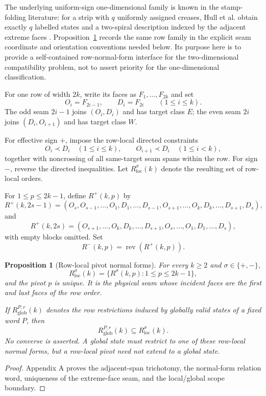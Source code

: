\documentclass[11pt]{article}
\newtheorem{proposition}[theorem]{Proposition}
\theoremstyle{definition}
\theoremstyle{remark}
\begin{document}
The underlying uniform-sign one-dimensional family is known in the stamp-folding literature: for a strip with $q$ uniformly assigned creases, Hull et al. obtain exactly $q$ labelled states and a two-spiral description indexed by the adjacent extreme faces \cite[Theorem~2.1 and the proof of Theorem~3.1]{HullEtAl2025}. Proposition~\ref{obj:P2} records the same row family in the explicit seam coordinate and orientation conventions needed below. Its purpose here is to provide a self-contained row-normal-form interface for the two-dimensional compatibility problem, not to assert priority for the one-dimensional classification.

For one row of width \(2k\), write its faces as \(F_1,\ldots,F_{2k}\)
and set \[
O_i=F_{2i-1},\qquad D_i=F_{2i}\qquad(1\le i\le k).
\] The odd seam \(2i-1\) joins \((O_i,D_i)\) and has target class \(E\);
the even seam \(2i\) joins \((D_i,O_{i+1})\) and has target class \(W\).

For effective sign \(+\), impose the row-local directed constraints \[
O_i\prec D_i\quad(1\le i\le k),\qquad
O_{i+1}\prec D_i\quad(1\le i<k),
\] together with noncrossing of all same-target seam spans within the
row. For sign \(-\), reverse the directed inequalities. Let
\(R_{\mathrm{loc}}^\sigma(k)\) denote the resulting set of row-local
orders.

For \(1\le p\le2k-1\), define \(R^+(k,p)\) by \[
R^+(k,2s-1)=
(O_s,O_{s-1},\ldots,O_1,
D_1,\ldots,D_{s-1},
O_{s+1},\ldots,O_k,
D_k,\ldots,D_{s+1},D_s),
\] and \[
R^+(k,2s)=
(O_{s+1},\ldots,O_k,
D_k,\ldots,D_{s+1},
O_s,\ldots,O_1,
D_1,\ldots,D_s),
\] with empty blocks omitted. Set \[
R^-(k,p)=\operatorname{rev}(R^+(k,p)).
\]

\begin{proposition}[Row-local pivot normal forms]\label{obj:P2}
For every \(k\ge2\) and \(\sigma\in\{+,-\}\), \[
R_{\mathrm{loc}}^\sigma(k)
=
\{R^\sigma(k,p):1\le p\le2k-1\},
\] and the pivot \(p\) is unique. It is the physical seam whose incident
faces are the first and last faces of the row order.

If \(R_{\mathrm{glob}}^{P,r}(k)\) denotes the row restrictions induced
by globally valid states of a fixed word \(P\), then \[
R_{\mathrm{glob}}^{P,r}(k)\subseteq R_{\mathrm{loc}}^\sigma(k).
\] No converse is asserted. A global state must restrict to one of these
row-local normal forms, but a row-local pivot need not extend to a
global state.
\end{proposition}
\begin{proof}
 Appendix A proves the adjacent-span trichotomy, the
normal-form relation word, uniqueness of the extreme-face seam, and the
local/global scope boundary.
\end{proof}
\end{document}
